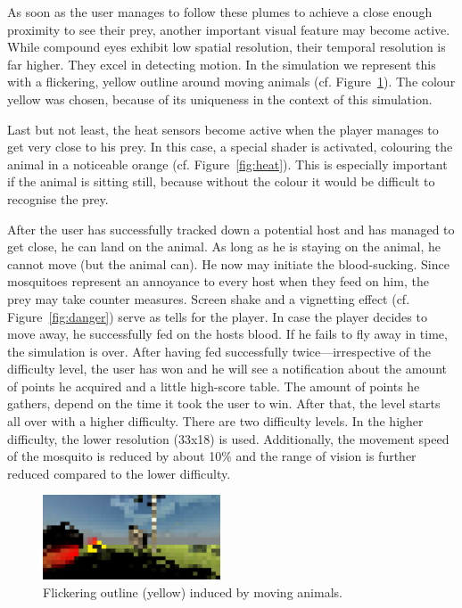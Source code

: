 \documentclass{sig-alternate-05-2015}
\begin{document}
As soon as the user manages to follow these plumes to achieve a close enough proximity to see their prey, another important visual feature may become active. While compound eyes exhibit low spatial resolution, their temporal resolution is far higher. They excel in detecting motion. In the simulation we represent this with a flickering, yellow outline around moving animals (cf. Figure~\ref{fig:flickr}). The colour yellow was chosen, because of its uniqueness in the context of this simulation.

Last but not least, the heat sensors become active when the player manages to get very close to his prey. In this case, a special shader is activated, colouring the animal in a noticeable orange (cf. Figure~\ref{fig:heat}). This is especially important if the animal is sitting still, because without the colour it would be difficult to recognise the prey.


After the user has successfully tracked down a potential host and has managed to get close, he can land on the animal. As long as he is staying on the animal, he cannot move (but the animal can). He now may initiate the blood-sucking. Since mosquitoes represent an annoyance to every host when they feed on him, the prey may take counter measures. Screen shake and a vignetting effect (cf. Figure~\ref{fig:danger}) serve as tells for the player. In case the player decides to move away, he successfully fed on the hosts blood. If he fails to fly away in time, the simulation is over. After having fed successfully twice---irrespective of the difficulty level, the user has won and he will see a notification about the amount of points he acquired and a little high-score table. The amount of points he gathers, depend on the time it took the user to win. After that, the level starts all over with a higher difficulty. There are two difficulty levels. In the higher difficulty, the lower resolution (33x18) is used. Additionally, the movement speed of the mosquito is reduced by about 10\% and the range of vision is further reduced compared to the lower difficulty.

\begin{figure}[ht!]
\includegraphics[width=0.47\textwidth]{Figures/flickr.png}
\caption{Flickering outline (yellow) induced by moving animals.}
\label{fig:flickr}
\end{figure}
\end{document}
